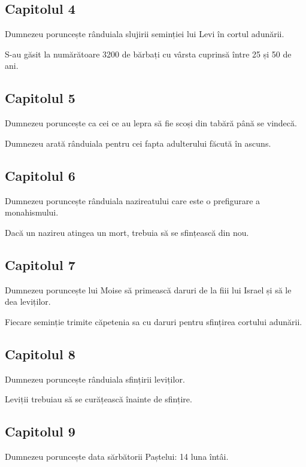\documentclass[12pt,a4paper]{article}
\begin{document}
\subsection{Capitolul 4}

Dumnezeu poruncește rânduiala slujirii seminției lui Levi în cortul adunării.

S-au găsit la numărătoare 3200 de bărbați cu vârsta cuprinsă între 25 și 50 de ani.

\subsection{Capitolul 5}

Dumnezeu poruncește ca cei ce au lepra să fie scoși din tabără până se vindecă.

Dumnezeu arată rânduiala pentru cei fapta adulterului făcută în ascuns.

\subsection{Capitolul 6}

Dumnezeu poruncește rânduiala nazireatului care este o prefigurare a monahismului.

Dacă un nazireu atingea un mort, trebuia să se sfințească din nou.

\subsection{Capitolul 7}

Dumnezeu poruncește lui Moise să primească daruri de la fiii lui Israel și să le dea leviților.

Fiecare seminție trimite căpetenia sa cu daruri pentru sfințirea cortului adunării.

\subsection{Capitolul 8}

Dumnezeu poruncește rânduiala sfințirii leviților.

Leviții trebuiau să se curățească înainte de sfințire.

\subsection{Capitolul 9}

Dumnezeu poruncește data sărbătorii Paștelui: 14 luna întâi.
\end{document}
